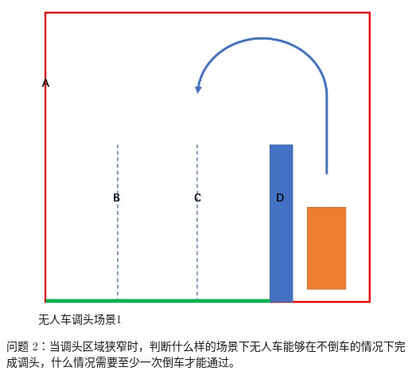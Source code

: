 \documentclass{article}
\begin{document}
\begin{figure}[H]%
    \centering
    \includegraphics[scale=0.8]{1.jpg}
    \caption{无人车调头场景1}
\end{figure}

问题 2：当调头区域狭窄时，判断什么样的场景下无人车能够在不倒车的情况下完成调头，什么情况需要至少一次倒车才能通过。
\end{document}
